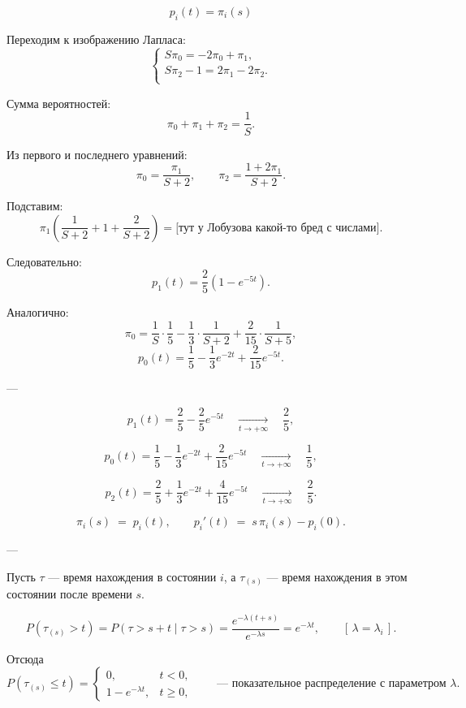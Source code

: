 $$p_i(t)=\pi_i (s)$$

\vspace{1em}
Переходим к изображению Лапласа:
$$
	\begin{cases}
		S \pi_0  = -2 \pi_0 + \pi_1,     \\
		S \pi_2 - 1 = 2 \pi_1 - 2 \pi_2. \\
	\end{cases}
$$

Сумма вероятностей:
\[
	\pi_0 + \pi_1 + \pi_2 = \frac{1}{S}.
\]

Из первого и последнего уравнений:
\[
	\pi_0 = \frac{\pi_1}{S + 2}, \qquad
	\pi_2 = \frac{1 + 2\pi_1}{S + 2}.
\]

Подставим:
\[
	\pi_1\!\left(\frac{1}{S + 2} + 1 + \frac{2}{S + 2}\right)
	= \text{[тут у Лобузова какой-то бред с числами]}.
\]

Следовательно:
\[
	p_1(t) = \frac{2}{5}\left(1 - e^{-5t}\right).
\]

Аналогично:
\[
	\pi_0 = \frac{1}{S} \cdot \frac{1}{5} - \frac{1}{3} \cdot \frac{1}{S + 2} + \frac{2}{15} \cdot \frac{1}{S + 5},
\]
\[
	p_0(t) = \frac{1}{5} - \frac{1}{3}e^{-2t} + \frac{2}{15}e^{-5t}.
\]

---

\[
	p_1(t) = \frac{2}{5} - \frac{2}{5} e^{-5t}
	\quad \xrightarrow[t \to +\infty]{} \quad
	\frac{2}{5},
\]

\[
	p_0(t) = \frac{1}{5} - \frac{1}{3} e^{-2t} + \frac{2}{15} e^{-5t}
	\quad \xrightarrow[t \to +\infty]{} \quad
	\frac{1}{5},
\]

\[
	p_2(t) = \frac{2}{5} + \frac{1}{3} e^{-2t} + \frac{4}{15} e^{-5t}
	\quad \xrightarrow[t \to +\infty]{} \quad
	\frac{2}{5}.
\]

\vspace{1em}

\[
	\pi_i(s) \; = \; p_i(t),
	\qquad
	p_i'(t) \; = \; s\,\pi_i(s) - p_i(0).
\]

---

Пусть $\tau$ — время нахождения в состоянии $i$,
а $\tau_{(s)}$ — время нахождения в этом состоянии после времени $s$.

\[
	P(\tau_{(s)} > t)
	= P(\tau > s + t \mid \tau > s)
	= \frac{e^{-\lambda (t + s)}}{e^{-\lambda s}}
	= e^{-\lambda t},
	\qquad [\,\lambda = \lambda_i\,].
\]

Отсюда
\[
	P(\tau_{(s)} \le t) =
	\begin{cases}
		0,                  & t < 0,   \\[6pt]
		1 - e^{-\lambda t}, & t \ge 0,
	\end{cases}
	\qquad
	\text{— показатель­ное распределение с параметром } \lambda.
\]

